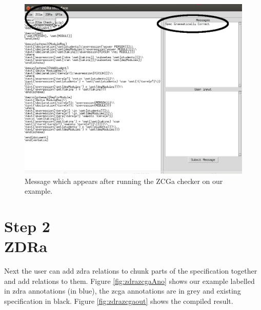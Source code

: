 \begin{figure}[H]
\centering
\includegraphics[scale=0.4]{Figures/fullexample/zcgacorrect.png}
\caption{Message which appears after running the ZCGa checker on our example. \label{fig:zcgacorrect}}
\end{figure}

\section{Step 2\\ZDRa}

Next the user can add \gls{zdra} relations to chunk parts of the specification
together and add relations to them. Figure \ref{fig:zdrazcgaAno} shows our
example labelled in \gls{zdra} annotations (in blue), the \gls{zcga} annotations
are in grey and existing specification in black. Figure \ref{fig:zdrazcgaout}
shows the compiled result.


